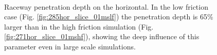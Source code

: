 \begin{figure}[htbp]
\centering 
  \quad
  \quad
  \\
  \caption[Raceway penetration depth on the horizontal]{Raceway penetration
  depth on the horizontal. In the low friction case (Fig.
  \ref{fig:285hor_slice_01mslf}) the penetration depth is 65\% larger than in the high friction simulation (Fig.
  \ref{fig:271hor_slice_01mshf}), showing the deep influence of this parameter
  even in large scale simulations.}
  \label{fig:286hor_slice_01ms}
\end{figure}